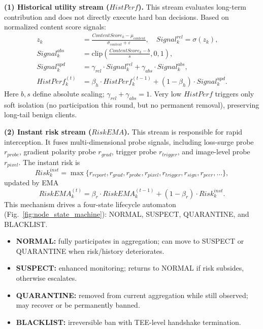 \documentclass[runningheads]{llncs}
\begin{document}
\textbf{(1) Historical utility stream ($HistPerf$).} This stream evaluates long-term contribution and does not directly execute hard ban decisions. Based on normalized content score signals:
\begin{align}
    z_{k} &= \frac{ContentScore_{k} - \mu_{content}}{\sigma_{content} + \varepsilon}, \quad Signal_{k}^{rel} = \sigma(z_{k}), \\
    Signal_{k}^{abs} &= \mathrm{clip}\left(\frac{ContentScore_{k} - b}{s}, 0, 1\right), \\
    Signal_{k}^{upd} &= \gamma_{rel} \cdot Signal_{k}^{rel} + \gamma_{abs} \cdot Signal_{k}^{abs}, \\
    HistPerf_{k}^{(t)} &= \beta_{h} \cdot HistPerf_{k}^{(t-1)} + (1 - \beta_{h}) \cdot Signal_{k}^{upd}.
\end{align}
Here $b,s$ define absolute scaling; $\gamma_{rel}+\gamma_{abs}=1$. Very low $HistPerf$ triggers only soft isolation (no participation this round, but no permanent removal), preserving long-tail benign clients.

\textbf{(2) Instant risk stream ($RiskEMA$).} This stream is responsible for rapid interception. It fuses multi-dimensional probe signals, including loss-surge probe $r_{probe}$, gradient polarity probe $r_{grad}$, trigger probe $r_{trigger}$, and image-level probe $r_{pixel}$. The instant risk is
\begin{equation}
    Risk_{k}^{inst} = \max\{r_{report}, r_{grad}, r_{probe}, r_{pixel}, r_{trigger}, r_{sign}, r_{peer}, \dots \},
\end{equation}
updated by EMA
\begin{equation}
    RiskEMA_{k}^{(t)} = \beta_{r} \cdot RiskEMA_{k}^{(t-1)} + (1 - \beta_{r}) \cdot Risk_{k}^{inst}.
\end{equation}
This mechanism drives a four-state lifecycle automaton (Fig.~\ref{fig:node_state_machine}): NORMAL, SUSPECT, QUARANTINE, and BLACKLIST.

\begin{itemize}
    \item \textbf{NORMAL:} fully participates in aggregation; can move to SUSPECT or QUARANTINE when risk/history deteriorates.
    \item \textbf{SUSPECT:} enhanced monitoring; returns to NORMAL if risk subsides, otherwise escalates.
    \item \textbf{QUARANTINE:} removed from current aggregation while still observed; may recover or be permanently banned.
    \item \textbf{BLACKLIST:} irreversible ban with TEE-level handshake termination.
\end{itemize}
\end{document}
